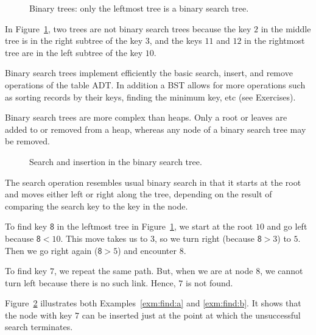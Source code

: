 \begin{figure}[htb!]
\centerline{
}
\caption{\label{btree-e1} Binary trees: only the leftmost tree is
a binary search tree.}
\end{figure}
\begin{Example}
In Figure~\ref{btree-e1}, two trees are not binary search trees 
because the key $2$ in the middle tree is
in the right subtree of the key $3$, 
and the keys $11$ and $12$ in the rightmost tree are
in the left subtree of the key $10$.
\end{Example}
Binary search trees implement efficiently the basic search, insert, and remove
operations of the table ADT. In addition a BST allows for more operations 
such as sorting records by their keys, finding the minimum key, etc (see Exercises).

Binary search trees are more complex than heaps. Only a root or 
leaves are added to or removed from a heap, whereas
any node of a binary search tree may be removed.

\begin{figure}[htbp]
\centerline{
}
\caption{\label{findinsr} Search and insertion in the binary search tree.}
\end{figure}

The search operation resembles usual binary search in that it starts 
at the root and moves either left or right along the tree, depending on 
the result of comparing the search key to the key in the node. 

\begin{Example}
\label{exm:find:a}
To find key $\textsf{8}$ in the leftmost tree in
Figure~\ref{btree-e1}, we
start at the root $10$ and go left because $\textsf{8} < 10$. This move
takes us to $3$, so we turn right (because $\textsf{8} > 3$) to $5$. Then we
go right again ($\textsf{8} > 5$) and encounter $8$. 
\end{Example}

\begin{Example}
\label{exm:find:b}
To find key $7$, we repeat the same path. But, when we are at node $8$, we 
cannot turn left because there is no such link. Hence, $7$ is not found. 
\end{Example}

Figure~\ref{findinsr} illustrates both Examples~\ref{exm:find:a} and
\ref{exm:find:b}. It shows that the node with key $7$ can be inserted
just at the point at which the unsuccessful search terminates.  

